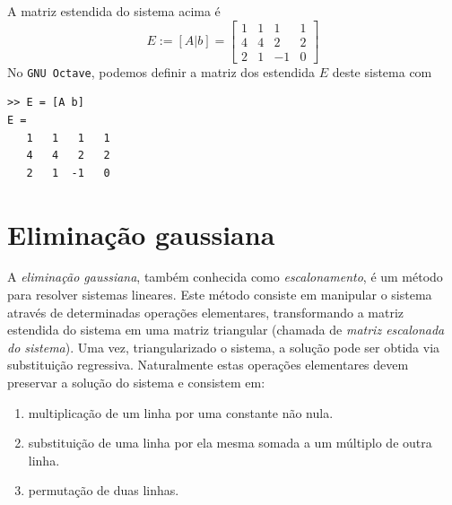 \begin{ex}
A matriz estendida do sistema acima é
\begin{equation}
  E := [A|b] =
  \begin{bmatrix}
    1 & 1 & 1 & 1\\
    4 & 4 & 2 & 2\\
    2 & 1 & -1 & 0
  \end{bmatrix}
\end{equation}
\ifisoctave
No \verb+GNU Octave+, podemos definir a matriz dos estendida $E$ deste sistema com
\begin{verbatim}
>> E = [A b]
E =
   1   1   1   1
   4   4   2   2
   2   1  -1   0
\end{verbatim}
\fi
\end{ex}




\section{Eliminação gaussiana}
A \emph{eliminação gaussiana}, também conhecida como \emph{escalonamento}, é um método para resolver sistemas lineares. Este método consiste em manipular o sistema através de determinadas operações elementares, transformando a matriz estendida do sistema em uma matriz triangular (chamada de \emph{matriz escalonada do sistema}). Uma vez, triangularizado o sistema, a solução pode ser obtida via substituição regressiva. Naturalmente estas operações elementares devem preservar a solução do sistema e consistem em:
\begin{enumerate}
\item multiplicação de um linha por uma constante não nula.
\item substituição de uma linha por ela mesma somada a um múltiplo de outra linha.
\item permutação de duas linhas.
\end{enumerate}

